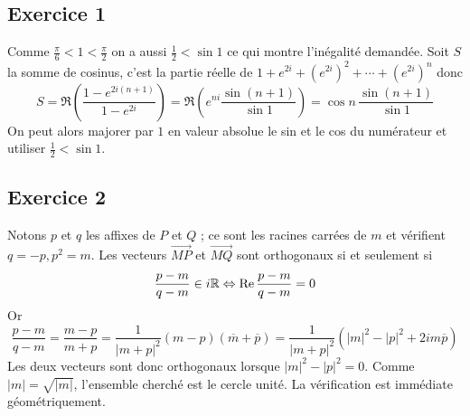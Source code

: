 \subsection*{Exercice 1}   Comme $\frac{\pi }{6}<1<\frac{\pi }{2}$ on a aussi $\frac{1}{2}<\sin 1$ ce qui montre l'inégalité demandée.\newline 
Soit $S$ la somme de cosinus, c'est la partie réelle de $1+e^{2i}+(e^{2i})^{2}+\cdots +(e^{2i})^{n}$ donc
\begin{displaymath}
S = \Re\left( \frac{1-e^{2i(n+1)}}{1-e^{2i}}\right) 
 = \Re\left(e^{ni}\frac{\sin (n+1)}{\sin 1}\right) 
 = \cos n\, \frac{\sin (n+1)}{\sin 1}
\end{displaymath}
On peut alors majorer par $1$ en valeur absolue le sin et le cos du numérateur et utiliser $\frac{1}{2}<\sin 1$.


\subsection*{Exercice 2} Notons $p$ et $q$ les affixes de $P$ et $Q$ ; ce sont les racines carrées de $m$ et vérifient $q=-p,p^{2}=m$. Les vecteurs $\overrightarrow{MP}$ et $\overrightarrow{MQ}$ sont orthogonaux si et seulement si
\begin{displaymath}
\frac{p-m}{q-m}\in i\mathbb{R}\Leftrightarrow \operatorname{Re}\frac{p-m}{q-m}=0
\end{displaymath}
Or
\begin{displaymath}
\frac{p-m}{q-m} = \frac{m-p}{m+p} = \frac{1}{|m+p|^{2}}(m-p)(\overline{m}+\overline{p})
= \frac{1}{|m+p|^{2}}(|m|^{2}-|p|^{2}+2im\overline{p})
\end{displaymath}
Les deux vecteurs sont donc orthogonaux lorsque $|m|^{2}-|p|^{2}=0$.\newline
Comme $|m|=\sqrt{|m|}$, l'ensemble cherché est le cercle unité. La vérification est immédiate géométriquement.

